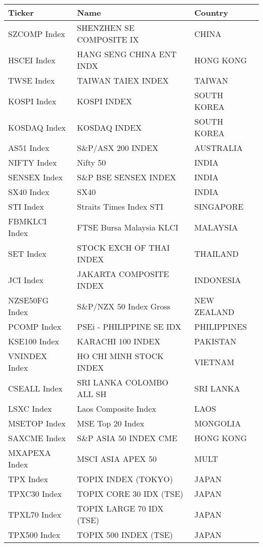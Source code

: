 \begin {table}[H]
\begin{center}
\small
\hspace*{-3cm}
\begin{tabu}{| l l l |} 
\hline
Ticker & Name & Country\\
\hline
SZCOMP Index & SHENZHEN SE COMPOSITE IX & CHINA \\ 
HSCEI Index & HANG SENG CHINA ENT INDX & HONG KONG \\ 
TWSE Index & TAIWAN TAIEX INDEX & TAIWAN \\ 
KOSPI Index & KOSPI INDEX & SOUTH KOREA \\ 
KOSDAQ Index & KOSDAQ INDEX & SOUTH KOREA \\ 
AS51 Index & S\&P/ASX 200 INDEX & AUSTRALIA \\ 
NIFTY Index & Nifty 50 & INDIA \\ 
SENSEX Index & S\&P BSE SENSEX INDEX & INDIA \\ 
SX40 Index & SX40 & INDIA \\ 
STI Index & Straits Times Index STI & SINGAPORE \\ 
FBMKLCI Index & FTSE Bursa Malaysia KLCI & MALAYSIA \\ 
SET Index & STOCK EXCH OF THAI INDEX & THAILAND \\ 
JCI Index & JAKARTA COMPOSITE INDEX & INDONESIA \\ 
NZSE50FG Index & S\&P/NZX 50 Index Gross & NEW ZEALAND \\ 
PCOMP Index & PSEi - PHILIPPINE SE IDX & PHILIPPINES \\ 
KSE100 Index & KARACHI 100 INDEX & PAKISTAN \\ 
VNINDEX Index & HO CHI MINH STOCK INDEX & VIETNAM \\ 
CSEALL Index & SRI LANKA COLOMBO ALL SH & SRI LANKA \\ 
LSXC Index & Laos Composite Index & LAOS \\ 
MSETOP Index & MSE Top 20 Index & MONGOLIA \\ 
SAXCME Index & S\&P ASIA 50 INDEX CME & HONG KONG \\ 
MXAPEXA Index & MSCI ASIA APEX 50 & MULT \\ 
TPX Index & TOPIX INDEX (TOKYO) & JAPAN \\ 
TPXC30 Index & TOPIX CORE 30 IDX (TSE) & JAPAN \\ 
TPXL70 Index & TOPIX LARGE 70 IDX (TSE) & JAPAN \\ 
TPX500 Index & TOPIX 500 INDEX (TSE) & JAPAN \\ 

\end{tabu}
\end{center}
\end{table}
